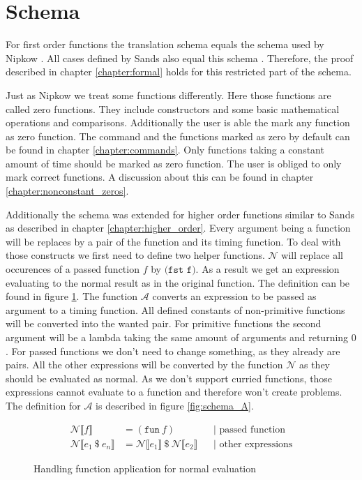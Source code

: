 
\section{Schema} \label{chapter:impl_schema}

For first order functions the translation schema equals the schema used by Nipkow \parencite{fds}.
All cases defined by Sands also equal this schema \parencite{sands}.
Therefore, the proof described in chapter \ref{chapter:formal} holds for this restricted part of the schema.

Just as Nipkow we treat some functions differently.
Here those functions are called zero functions.
They include constructors and some basic mathematical operations and comparisons.
Additionally the user is able the mark any function as zero function.
The command and the functions marked as zero by default can be found in chapter \ref{chapter:commands}.
Only functions taking a constant amount of time should be marked as zero function.
The user is obliged to only mark correct functions.
A discussion about this can be found in chapter \ref{chapter:nonconstant_zeros}.

Additionally the schema was extended for higher order functions similar to Sands as described in chapter \ref{chapter:higher_order}.
Every argument being a function will be replaces by a pair of the function and its timing function.
To deal with those constructs we first need to define two helper functions.
$\mathcal{N}$ will replace all occurences of a passed function $f$ by $\texttt{(fst f)}$.
As a result we get an expression evaluating to the normal result as in the original function.
The definition can be found in figure \ref{fig:schema_N}.
The function $\mathcal{A}$ converts an expression to be passed as argument to a timing function.
All defined constants of non-primitive functions will be converted into the wanted pair.
For primitive functions the second argument will be a lambda taking the same amount of arguments and returning $0$.
For passed functions we don't need to change something, as they already are pairs.
All the other expressions will be converted by the function $\mathcal{N}$ as they should be evaluated as normal.
As we don't support curried functions, those expressions cannot evaluate to a function and therefore won't create problems.
The definition for $\mathcal{A}$ is described in figure \ref{fig:schema_A}.
\begin{figure}
\begin{align*}
  \mathcal{N}\llbracket f\rrbracket &= (\texttt{fun}\ f) &&\text{| passed function}\\
  \mathcal{N}\llbracket e_{1}\ \$\ e_{n}\rrbracket &= \mathcal{N}\llbracket e_{1}\rrbracket\ \$\ \mathcal{N}\llbracket e_{2}\rrbracket &&\text{| other expressions}
\end{align*}
\caption{Handling function application for normal evaluation}
\label{fig:schema_N}
\end{figure}

